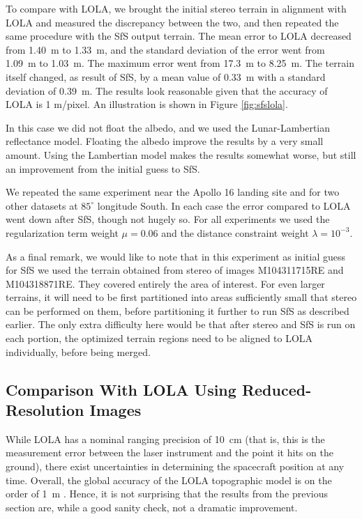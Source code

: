 \documentclass[12pt,oneside]{article}
\begin{document}
To compare with LOLA, we brought the initial stereo terrain 
in alignment with LOLA and measured the discrepancy between the two, and
then repeated the same procedure with the SfS output terrain. 
The mean error to LOLA decreased from 1.40~m to 1.33~m, and the standard deviation of the error
went from 1.09~m to 1.03~m. The maximum error went from 17.3~m to 8.25~m. 
The terrain itself changed, as result of SfS, by a mean value of 0.33~m
with a standard deviation of 0.39~m. The results look reasonable given that the accuracy of
LOLA is 1 m/pixel. An illustration is shown in Figure \ref{fig:sfslola}.

In this case we did not float the albedo, and we used the
Lunar-Lambertian reflectance model.  Floating the albedo improve the
results by a very small amount. Using the Lambertian model makes the results somewhat worse, but still an improvement
from the initial guess to SfS.

We repeated the same experiment near the Apollo 16 landing site and for
two other datasets at $85^\circ$ longitude South. In each case the error
compared to LOLA went down after SfS, though not hugely so. For all
experiments we used the regularization term weight $\mu = 0.06$ and the
distance constraint weight $\lambda = 10^{-3}.$

As a final remark, we would like to note that in this experiment as
initial guess for SfS we used the terrain obtained from stereo of images
M104311715RE and M104318871RE. They covered entirely the area of
interest. For even larger terrains, it will need to be first partitioned
into areas sufficiently small that stereo can be performed on them,
before partitioning it further to run SfS as described earlier. The only
extra difficulty here would be that after stereo and SfS is run on each
portion, the optimized terrain regions need to be aligned to LOLA
individually, before being merged.

\subsection{Comparison With LOLA Using Reduced-Resolution Images}

While LOLA has a nominal ranging precision of 10~cm (that is, this is the measurement
error between the laser instrument and the point it hits on the ground), there exist uncertainties in 
determining the spacecraft position at any time. Overall, the global accuracy of the LOLA topographic
model is on the order of 1~m \cite{smith2011results}. Hence, it is not surprising that the results
from the previous section are, while a good sanity check, not a dramatic improvement.
\end{document}
